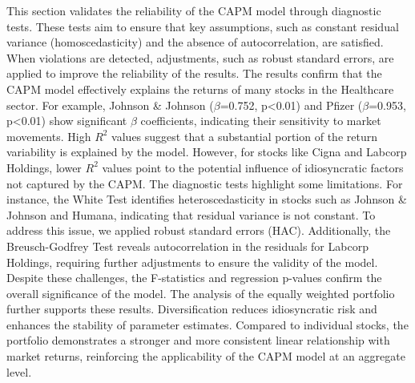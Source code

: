 This section validates the reliability of the CAPM model through diagnostic tests. 
These tests aim to ensure that key assumptions, such as constant residual variance (homoscedasticity) and the absence of 
autocorrelation, are satisfied. When violations are detected, adjustments, such as robust standard errors, are applied to 
improve the reliability of the results.
The results confirm that the CAPM model effectively explains the returns of many stocks in the Healthcare sector. 
For example, Johnson \& Johnson ($\beta$=0.752, p<0.01) and Pfizer ($\beta$=0.953, p<0.01) show significant $\beta$
coefficients, indicating their sensitivity to market movements.
High $R^2$ values suggest that a substantial portion of the return variability is explained by the model.
However, for stocks like Cigna and Labcorp Holdings, lower $R^2$ values point to the potential influence of idiosyncratic 
factors not captured by the CAPM.
The diagnostic tests highlight some limitations. For instance, the White Test identifies heteroscedasticity in stocks such as 
Johnson \& Johnson and Humana, indicating that residual variance is not constant. 
To address this issue, we applied robust standard errors (HAC). 
Additionally, the Breusch-Godfrey Test reveals autocorrelation in the residuals for Labcorp Holdings, requiring further 
adjustments to ensure the validity of the model. 
Despite these challenges, the F-statistics and regression p-values confirm the overall significance of the model.
The analysis of the equally weighted portfolio further supports these results. 
Diversification reduces idiosyncratic risk and enhances the stability of parameter estimates. 
Compared to individual stocks, the portfolio demonstrates a stronger and more consistent linear relationship with market 
returns, reinforcing the applicability of the CAPM model at an aggregate level.

